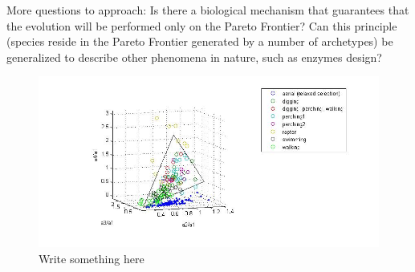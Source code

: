 \documentclass{article}
\theoremstyle{definition}
\theoremstyle{remark}
\begin{document}
More questions to approach:
Is there a biological mechanism that guarantees that the evolution will be performed only on the Pareto Frontier?
Can this principle (species reside in the Pareto Frontier generated by a number of archetypes) 
be generalized to describe other phenomena in nature, such as enzymes design?


\begin{figure}
\includegraphics{Birds.jpg}
\caption{Write something here} 
\label{fig:birds}
\end{figure}



\end{document}
